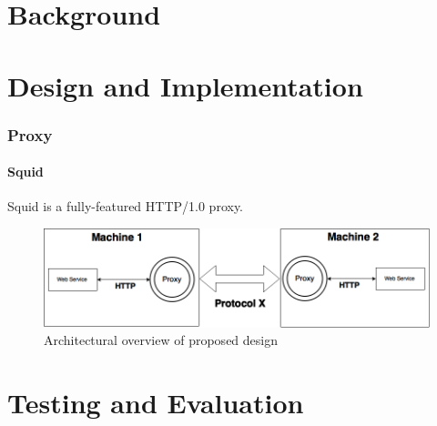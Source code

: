 \documentclass[USenglish]{article}
\begin{document}
\part{Background}

\part{Design and Implementation}
\section{Proxy}
\subsection{Squid}
Squid is a fully-featured HTTP/1.0 proxy.
\begin{figure}[h]
\includegraphics[scale=0.4]{images/architecture.png}
\caption{Architectural overview of proposed design}
\end{figure}


\part{Testing and Evaluation}
\end{document}
